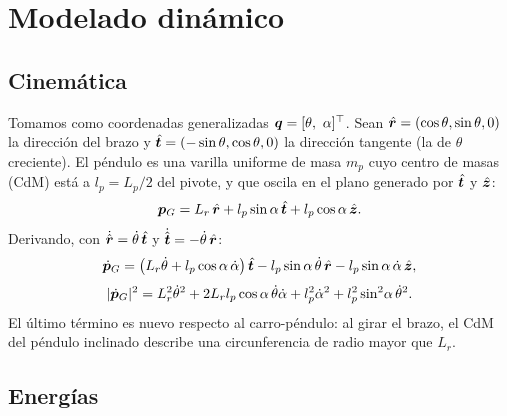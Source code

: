 \chapter{Modelado dinámico}
\label{cap:modelo}

\section{Cinemática}

Tomamos como coordenadas generalizadas $\bm{q}=[\theta,\ \alpha]^\top$. Sean $\hat{\bm{r}}=(\cos\theta,\sin\theta,0)$ la dirección del brazo y $\hat{\bm{t}}=(-\sin\theta,\cos\theta,0)$ la dirección tangente (la de $\theta$ creciente). El péndulo es una varilla uniforme de masa $m_p$ cuyo centro de masas (CdM) está a $l_p=L_p/2$ del pivote, y que oscila en el plano generado por $\hat{\bm{t}}$ y $\hat{\bm{z}}$:
\begin{equation}
  \bm{p}_G = L_r\,\hat{\bm{r}} + l_p\sin\alpha\,\hat{\bm{t}} + l_p\cos\alpha\,\hat{\bm{z}}.
\end{equation}
Derivando, con $\dot{\hat{\bm{r}}}=\dot{\theta}\,\hat{\bm{t}}$ y $\dot{\hat{\bm{t}}}=-\dot{\theta}\,\hat{\bm{r}}$:
\begin{equation}
  \dot{\bm{p}}_G = \left(L_r\dot{\theta} + l_p\cos\alpha\,\dot{\alpha}\right)\hat{\bm{t}} - l_p\sin\alpha\,\dot{\theta}\,\hat{\bm{r}} - l_p\sin\alpha\,\dot{\alpha}\,\hat{\bm{z}},
\end{equation}
\begin{equation}
  |\dot{\bm{p}}_G|^2 = L_r^2\dot{\theta}^2 + 2L_rl_p\cos\alpha\,\dot{\theta}\dot{\alpha} + l_p^2\dot{\alpha}^2 + l_p^2\sin^2\!\alpha\,\dot{\theta}^2 .
\end{equation}
El último término es nuevo respecto al carro-péndulo: al girar el brazo, el CdM del péndulo inclinado describe una circunferencia de radio mayor que $L_r$.

\section{Energías}

